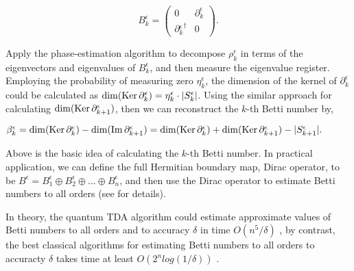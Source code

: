 \documentclass[aps,pra,singlecolumn,superscriptaddress]{revtex4-1}
\begin{document}
\[B_k^\epsilon  = \left( {\begin{array}{*{20}{c}}0&{\partial _k^\epsilon }\\{\partial {{_k^\epsilon }^\dag }}&0\end{array}} \right).\]

Apply the phase-estimation algorithm to decompose ${\rho _k^\epsilon }$ in terms of the eigenvectors and eigenvalues of ${B_k^\epsilon }$, and then measure the eigenvalue register. Employing the  probability of measuring zero ${\eta _k^\epsilon }$, the dimension of the kernel of ${\partial _k^\epsilon }$ could be calculated as ${\dim({\rm{Ker}}\,\partial _k^\epsilon) = \eta _k^\epsilon  \cdot |S_k^\epsilon |}$. Using the similar approach for calculating ${\dim({\rm{Ker}}\,\partial _{k + 1}^\epsilon )}$, then we can reconstruct the ${k}$-th Betti number by,

$
\beta _k^\epsilon =\dim({\rm{Ker}}\,\partial _k^\epsilon)  - \dim({\mathop{\rm Im}\nolimits} \,\partial _{k{\rm{ + }}1}^\epsilon) \nonumber=\dim({\rm{Ker}}\,\partial _k^\epsilon)  + \dim({\rm{Ker}}\,\partial _{k{\rm{ + }}1}^\epsilon) - |S_{k + 1}^\epsilon |.
$

Above is the basic idea of calculating the $k$-th Betti number. In practical application, we can define the full Hermitian boundary map, Dirac operator, to be ${B^\epsilon } = B_1^\epsilon  \oplus B_2^\epsilon  \oplus ... \oplus B_n^\epsilon$, and then use the Dirac operator to estimate Betti numbers to all orders (see \cite{lloyd2016quantum} for details).

In theory, the quantum TDA algorithm could estimate approximate values of Betti numbers to all orders and to accuracy $\delta$ in time $O({n^5}/\delta )$ \cite{lloyd2016quantum}, by contrast, the best classical algorithms for estimating Betti numbers to all orders to accuracty $\delta$ takes time at least $O({2^n}log(1/\delta ))$ \cite{cohen2007stability,basu1999bounding,*basu2003different,*basu2008computing,*basu2014algorithms,friedman1998computing}.


\end{document}
